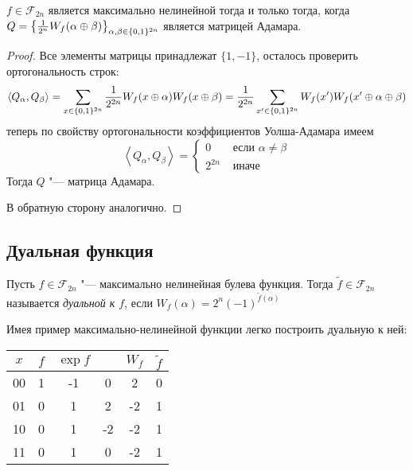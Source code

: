 \begin{theorem}
\label{bent_hadamard}
$f \in \mathscr{F}_{2n}$ является максимально нелинейной тогда и только тогда,
когда $Q = \left\{{1\over 2^{n}} W_f(\alpha \oplus \beta)\right\}_{\alpha, \beta \in \{0,1\}^{2n}}$
является матрицей Адамара.
\end{theorem}

\begin{proof}
Все элементы матрицы принадлежат $\{1,-1\}$, осталось проверить ортогональность строк:
$$\left\langle Q_{\alpha}, Q_{\beta} \right\rangle  = \sum\limits_{x \in \{0,1\}^{2n}} 
{1 \over 2^{2n}} W_f(x \oplus \alpha) W_f(x \oplus \beta) = {1 \over 2^{2n}} 
\sum\limits_{x' \in \{0,1\}^{2n}} W_f(x')  W_f(x' \oplus \alpha \oplus \beta)$$ 
теперь по свойству ортогональности коэффициентов Уолша-Адамара имеем
$$\left\langle Q_{\alpha}, Q_{\beta} \right\rangle = \begin{cases} 
                       0 & \text{ если } \alpha \neq \beta \\
                       2^{2n} & \text{ иначе }
                      \end{cases}$$
Тогда $Q$ "--- матрица Адамара.

В обратную сторону аналогично.
\end{proof}

\subsection{Дуальная функция}
\begin{definition}
Пусть $f \in \mathscr{F}_{2n}$ "--- максимально нелинейная булева функция. 
Тогда $\widetilde{f} \in \mathscr{F}_{2n}$ называется \emph{ дуальной к $f$},
если $W_f(\alpha) = 2^n (-1)^{\widetilde{f}(\alpha)}$
\end{definition}

\begin{example} Имея пример максимально-нелинейной функции легко построить
дуальную к ней:
\begin{center}
\begin{tabular}{c|c|c|c|c|c}

$x$ & $f$ & $\exp f$ & & $W_f$ & $\widetilde{f}$ \\
\hline
00 & 1 & -1 & 0 & 2 & 0 \\
01 & 0 & 1 & 2 & -2 & 1 \\
10 & 0 & 1 & -2 & -2 & 1 \\
11 & 0 & 1 & 0 & -2 & 1 

\end{tabular}
\end{center}
\end{example}

